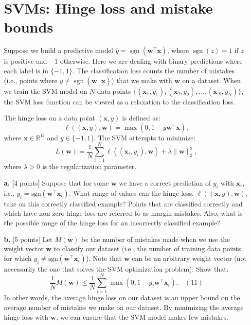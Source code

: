 \documentclass[a3paper,12pt]{extarticle} %
\begin{document}
\section{SVMs: Hinge loss and mistake bounds}
Suppose we build a predictive model $\hat{y} = \operatorname{sgn}(\mathbf{w}^\top \mathbf{x})$, where $\operatorname{sgn}(z) = 1$ if $z$ is positive and $-1$ otherwise. Here we are dealing with binary predictions where each label is in $\{-1, 1\}$. The classification loss counts the number of mistakes (i.e., points where $y \neq \operatorname{sgn}(\mathbf{w}^\top \mathbf{x})$) that we make with $\mathbf{w}$ on a dataset. When we train the SVM model on $N$ data points $\{(\mathbf{x}_1, y_1), (\mathbf{x}_2, y_2), \ldots, (\mathbf{x}_N, y_N)\}$, the SVM loss function can be viewed as a relaxation to the classification loss.

The hinge loss on a data point $(\mathbf{x}, y)$ is defined as:
\[
\ell((\mathbf{x}, y), \mathbf{w}) = \max(0, 1 - y \mathbf{w}^\top \mathbf{x}),
\]
where $\mathbf{x} \in \mathbb{R}^D$ and $y \in \{-1, 1\}$. The SVM attempts to minimize:
\[
L(\mathbf{w}) = \frac{1}{N} \sum_{i=1}^N \ell((\mathbf{x}_i, y_i), \mathbf{w}) + \lambda \|\mathbf{w}\|_2^2,
\]
where $\lambda > 0$ is the regularization parameter.

\noindent \textbf{a.} [4 points] Suppose that for some \( \mathbf{w} \) we have a correct prediction of \( y_i \) with \( \mathbf{x}_i \), i.e., \( y_i = \text{sgn}(\mathbf{w}^\top \mathbf{x}_i) \). What range of values can the hinge loss, \( \ell((\mathbf{x}, y), \mathbf{w}) \), take on this correctly classified example? Points that are classified correctly and which have non-zero hinge loss are referred to as margin mistakes. Also, what is the possible range of the hinge loss for an incorrectly classified example?

\noindent \textbf{b.} [5 points] Let \( M(\mathbf{w}) \) be the number of mistakes made when we use the weight vector \( \mathbf{w} \) to classify our dataset (i.e., the number of training data points for which \( y_i \neq \text{sgn}(\mathbf{w}^\top \mathbf{x}_i) \)). Note that \( \mathbf{w} \) can be an arbitrary weight vector (not necessarily the one that solves the SVM optimization problem). Show that:
\[
\frac{1}{N} M(\mathbf{w}) \leq \frac{1}{N} \sum_{i=1}^N \max \left( 0, 1 - y_i \mathbf{w}^\top \mathbf{x}_i \right). \quad (11)
\]
In other words, the average hinge loss on our dataset is an upper bound on the average number of mistakes we make on our dataset. By minimizing the average hinge loss with \( \mathbf{w} \), we can ensure that the SVM model makes few mistakes.
\end{document}
